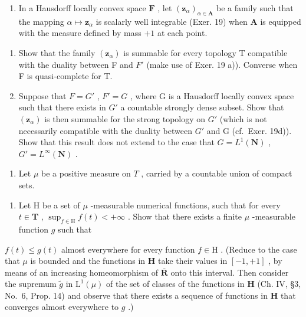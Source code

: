 \begin{enumerate}
\def\labelenumi{\arabic{enumi})}
\setcounter{enumi}{21}
\tightlist
\item
  In a Hausdorff locally convex space \(\mathbf{F}\) , let \((\mathbf{z}_{\alpha})_{\alpha \in \mathbf{A}}\) be a family such that the mapping \(\alpha \mapsto \mathbf{z}_{\alpha}\) is scalarly well integrable (Exer. 19) when \(\mathbf{A}\) is equipped with the measure defined by mass \(+1\) at each point.
\end{enumerate}

\begin{enumerate}
\def\labelenumi{\alph{enumi})}
\item
  Show that the family \((\mathbf{z}_{\alpha})\) is summable for every topology T compatible with the duality between F and \(F'\) (make use of Exer. 19 a)). Converse when F is quasi-complete for T.
\item
  Suppose that \(F = G'\) , \(F' = G\) , where G is a Hausdorff locally convex space such that there exists in \(G'\) a countable strongly dense subset. Show that \((\mathbf{z}_{\alpha})\) is then summable for the strong topology on \(G'\) (which is not necessarily compatible with the duality between \(G'\) and G (cf.~Exer. 19d)). Show that this result does not extend to the case that \(G = L^{1}(\mathbf{N})\) , \(G' = L^{\infty}(\mathbf{N})\) .
\end{enumerate}

\begin{enumerate}
\def\labelenumi{\arabic{enumi})}
\setcounter{enumi}{22}
\tightlist
\item
  Let \(\mu\) be a positive measure on \(T\) , carried by a countable union of compact sets.
\end{enumerate}

\begin{enumerate}
\def\labelenumi{\alph{enumi})}
\tightlist
\item
  Let H be a set of \(\mu\) -measurable numerical functions, such that for every \(t \in \mathbf{T}\) , \(\sup_{f \in \mathrm{H}} f(t) < +\infty\) . Show that there exists a finite \(\mu\) -measurable function \(g\) such that
\end{enumerate}

\(f(t) \leqslant g(t)\) almost everywhere for every function \(f \in \mathrm{H}\) . (Reduce to the case that \(\mu\) is bounded and the functions in \(\mathbf{H}\) take their values in \([-1, +1]\) , by means of an increasing homeomorphism of \(\overline{\mathbf{R}}\) onto this interval. Then consider the supremum \(\widetilde{g}\) in \(\mathrm{L}^1(\mu)\) of the set of classes of the functions in \(\mathbf{H}\) (Ch. IV, §3, No.~6, Prop. 14) and observe that there exists a sequence of functions in \(\mathbf{H}\) that converges almost everywhere to \(g\) .)

